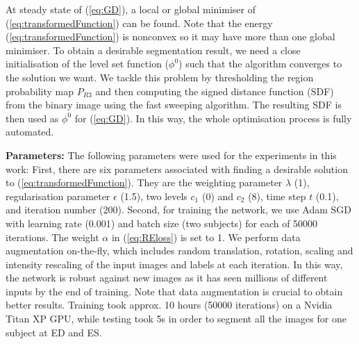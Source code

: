 \documentclass[runningheads,a4paper]{llncs}
\begin{document}
At steady state of (\ref{eq:GD}), a local or global minimiser of (\ref{eq:transformedFunction}) can be found. Note that the energy (\ref{eq:transformedFunction}) is nonconvex so it may have more than one global minimiser. To obtain a desirable segmentation result, we need a close initialisation of the level set function ($\phi^0$) such that the algorithm converges to the solution we want. We tackle this problem by thresholding the region probability map $P_{R3}$ and then computing the signed distance function (SDF) from the binary image using the fast sweeping algorithm. The resulting SDF is then used as $\phi^0$ for (\ref{eq:GD}). In this way, the whole optimisation process is fully automated. 

\textbf{Parameters:} The following parameters were used for the experiments in this work: First, there are six parameters associated with finding a desirable solution to (\ref{eq:transformedFunction}). They are the weighting parameter $\lambda$ (1), regularisation parameter $\epsilon$ (1.5), two levels $c_1$ (0) and $c_2$ (8), time step $t$ (0.1), and iteration number (200). Second, for training the network, we use Adam SGD with learning rate (0.001) and batch size (two subjects) for each of 50000 iterations. The weight $\alpha$ in (\ref{eq:REloss}) is set to 1. We perform data augmentation on-the-fly, which includes random translation, rotation, scaling and intensity rescaling of the input images and labels at each iteration. In this way, the network is robust against new images as it has seen millions of different inputs by the end of training. Note that data augmentation is crucial to obtain better results. Training took approx. 10 hours (50000 iterations) on a Nvidia Titan XP GPU, while testing took 5s in order to segment all the images for one subject at ED and ES. 
\end{document}
